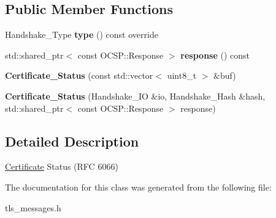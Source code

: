 \subsection*{Public Member Functions}
\begin{DoxyCompactItemize}
\item 
\mbox{\label{class_botan_1_1_t_l_s_1_1_certificate___status_a5fdb35a16d359c20ae87cb6fcba0c225}} 
Handshake\+\_\+\+Type {\bfseries type} () const override
\item 
\mbox{\label{class_botan_1_1_t_l_s_1_1_certificate___status_a190d2560f539382497c132c7c982c543}} 
std\+::shared\+\_\+ptr$<$ const O\+C\+S\+P\+::\+Response $>$ {\bfseries response} () const
\item 
\mbox{\label{class_botan_1_1_t_l_s_1_1_certificate___status_aba3aff6b2e745b9fc70c9a2fd0527425}} 
{\bfseries Certificate\+\_\+\+Status} (const std\+::vector$<$ uint8\+\_\+t $>$ \&buf)
\item 
\mbox{\label{class_botan_1_1_t_l_s_1_1_certificate___status_ae09cda79b422f560c5e54bf907316fb2}} 
{\bfseries Certificate\+\_\+\+Status} (Handshake\+\_\+\+IO \&io, Handshake\+\_\+\+Hash \&hash, std\+::shared\+\_\+ptr$<$ const O\+C\+S\+P\+::\+Response $>$ response)
\end{DoxyCompactItemize}


\subsection{Detailed Description}
\hyperlink{class_botan_1_1_t_l_s_1_1_certificate}{Certificate} Status (R\+FC 6066) 

The documentation for this class was generated from the following file\+:\begin{DoxyCompactItemize}
\item 
tls\+\_\+messages.\+h\end{DoxyCompactItemize}
